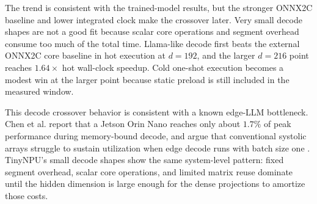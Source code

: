 \documentclass[a4paper, 12pt, titlepage]{article}
\begin{document}
\begin{table}[H]
    \centering
    \footnotesize
    \caption{Small transformer-like runtime comparison using the routed timing assumptions from Table~\ref{tab:vivado-timing}.}
    \label{tab:transformer-scaling}
\end{table}

The trend is consistent with the trained-model results, but the stronger ONNX2C baseline and lower integrated clock make the crossover later. Very small decode shapes are not a good fit because scalar core operations and segment overhead consume too much of the total time. Llama-like decode first beats the external ONNX2C core baseline in hot execution at \(d=192\), and the larger \(d=216\) point reaches \(1.64\times\) hot wall-clock speedup. Cold one-shot execution becomes a modest win at the larger point because static preload is still included in the measured window.

This decode crossover behavior is consistent with a known edge-LLM bottleneck. Chen et al. report that a Jetson Orin Nano reaches only about \(1.7\%\) of peak performance during memory-bound decode, and argue that conventional systolic arrays struggle to sustain utilization when edge decode runs with batch size one \cite{chen2025hybridsa}. TinyNPU's small decode shapes show the same system-level pattern: fixed segment overhead, scalar core operations, and limited matrix reuse dominate until the hidden dimension is large enough for the dense projections to amortize those costs.
\end{document}
